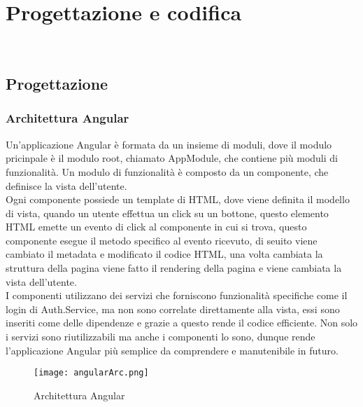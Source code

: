 
\chapter{Progettazione e codifica}
\label{cap:progettazione e codifica}

\\

\section{Progettazione}
\subsection{Architettura Angular}
Un'applicazione Angular è formata da un insieme di moduli, dove il modulo pricinpale è il modulo root, chiamato AppModule, che contiene più moduli di funzionalità. Un modulo di funzionalità è composto da un componente, che definisce la vista dell'utente.\\
Ogni componente possiede un template di HTML, dove viene definita il modello di vista, quando un utente effettua un click su un bottone, questo elemento HTML emette un evento di click al componente in cui si trova, questo componente esegue il metodo specifico al evento ricevuto, di seuito viene cambiato il metadata e modificato il codice HTML, una volta cambiata la struttura della pagina viene fatto il rendering della pagina e viene cambiata la vista dell'utente.\\
I componenti utilizzano dei servizi che forniscono funzionalità specifiche come il login di Auth.Service, ma non sono correlate direttamente alla vista, essi sono inseriti come delle dipendenze e grazie a questo rende il codice efficiente. Non solo i servizi sono riutilizzabili ma anche i componenti lo sono, dunque rende l'applicazione Angular più semplice da comprendere e manutenibile in futuro.\\
\begin{figure}[H]
    \centering
    \texttt{[image: angularArc.png]}
    \caption{Architettura Angular}
\end{figure}
